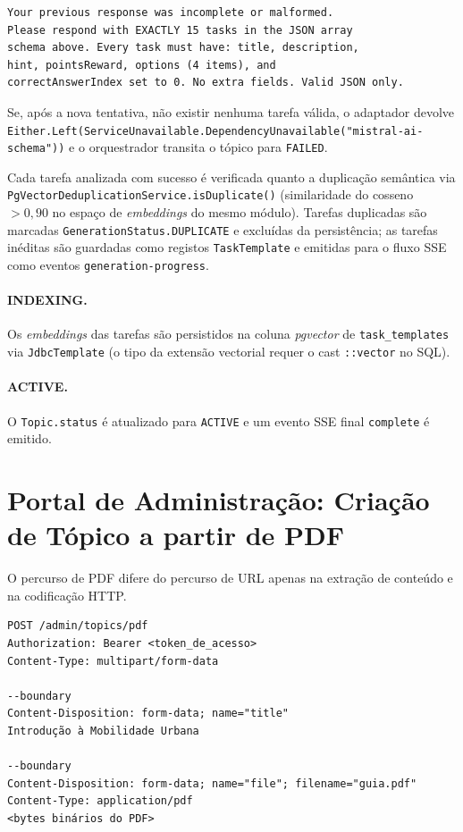 \begin{verbatim}
Your previous response was incomplete or malformed.
Please respond with EXACTLY 15 tasks in the JSON array
schema above. Every task must have: title, description,
hint, pointsReward, options (4 items), and
correctAnswerIndex set to 0. No extra fields. Valid JSON only.
\end{verbatim}

Se, após a nova tentativa, não existir nenhuma tarefa válida, o adaptador
devolve
\texttt{Either.Left(ServiceUnavailable.DependencyUnavailable("mistral-ai-schema"))}
e o orquestrador transita o tópico para \texttt{FAILED}.

Cada tarefa analizada com sucesso é verificada quanto a duplicação
semântica via
\texttt{PgVectorDeduplicationService.isDuplicate()} (similaridade do
cosseno $> 0{,}90$ no espaço de \textit{embeddings} do mesmo módulo).
Tarefas duplicadas são marcadas \texttt{GenerationStatus.DUPLICATE} e
excluídas da persistência; as tarefas inéditas são guardadas como
registos \texttt{TaskTemplate} e emitidas para o fluxo SSE como eventos
\texttt{generation-progress}.

\paragraph{INDEXING.}
Os \textit{embeddings} das tarefas são persistidos na coluna
\textit{pgvector} de \texttt{task\_templates} via \texttt{JdbcTemplate}
(o tipo da extensão vectorial requer o cast \texttt{::vector} no SQL).

\paragraph{ACTIVE.}
O \texttt{Topic.status} é atualizado para \texttt{ACTIVE} e um evento
SSE final \texttt{complete} é emitido.

\section{Portal de Administração: Criação de Tópico a partir de PDF}
\label{sec:topic_criacao_pdf}

O percurso de PDF difere do percurso de URL apenas na extração de conteúdo
e na codificação HTTP.

\begin{verbatim}
POST /admin/topics/pdf
Authorization: Bearer <token_de_acesso>
Content-Type: multipart/form-data

--boundary
Content-Disposition: form-data; name="title"
Introdução à Mobilidade Urbana

--boundary
Content-Disposition: form-data; name="file"; filename="guia.pdf"
Content-Type: application/pdf
<bytes binários do PDF>
\end{verbatim}

